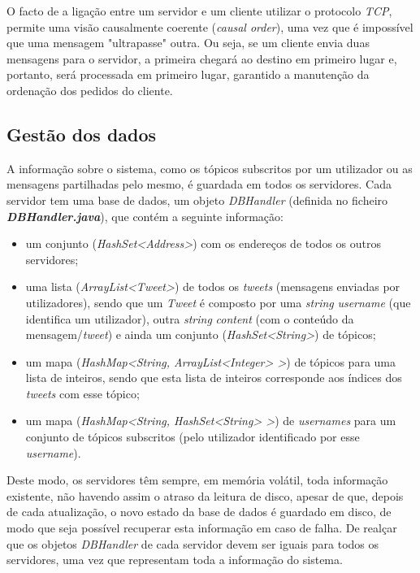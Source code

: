 \documentclass[a4paper]{report}
\begin{document}
		O facto de a ligação entre um servidor e um cliente utilizar o protocolo \textit{TCP}, permite uma visão causalmente coerente (\textit{causal order}), 
		uma vez que é impossível que uma mensagem "ultrapasse" outra. Ou seja, se um cliente envia duas mensagens para o servidor, a primeira chegará ao destino em primeiro lugar e, portanto, será processada em primeiro lugar, garantido a manutenção da ordenação dos pedidos do cliente.


		\subsection{Gestão dos dados}

		A informação sobre o sistema, como os tópicos subscritos por um utilizador ou as mensagens partilhadas pelo mesmo, é guardada em todos os servidores.
		Cada servidor tem uma base de dados, um objeto \textit{DBHandler} (definida no ficheiro \textit{\textbf{DBHandler.java}}), que contém a seguinte informação:
		\begin{itemize}
			\item um conjunto (\textit{HashSet<Address>}) com os endereços de todos os outros servidores;
			\item uma lista (\textit{ArrayList<Tweet>}) de todos os \textit{tweets} (mensagens enviadas por utilizadores), 
			sendo que um \textit{Tweet} é composto por uma \textit{string} \textit{username} (que identifica um utilizador), outra \textit{string} \textit{content} (com o conteúdo da mensagem/\textit{tweet})
			e ainda um conjunto (\textit{HashSet<String>}) de tópicos;
			\item um mapa (\textit{HashMap<String, ArrayList<Integer> >}) de tópicos para uma lista de inteiros, sendo que esta lista de inteiros corresponde aos índices dos \textit{tweets} com esse tópico;
			\item um mapa (\textit{HashMap<String, HashSet<String> >}) de \textit{usernames} para um conjunto de tópicos subscritos (pelo utilizador identificado por esse \textit{username}).
		\end{itemize}

		Deste modo, os servidores têm sempre, em memória volátil, toda informação existente, não havendo assim o atraso da leitura de disco, apesar de que, depois de cada atualização, o novo estado da base de dados é guardado em disco, de modo que seja possível recuperar esta informação em caso de falha.
		De realçar que os objetos \textit{DBHandler} de cada servidor devem ser iguais para todos os servidores, uma vez que representam toda a informação do sistema.
\end{document}
